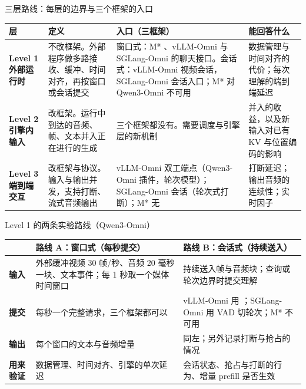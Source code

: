 
\begin{frame}[t]{三层路线：每层的边界与三个框架的入口}
\scriptsize
\renewcommand{\arraystretch}{1.1}
\setlength{\tabcolsep}{3pt}
\begin{tabularx}{\textwidth}{>{\bfseries}p{2.4cm} Y Y Y}
\toprule
{}
层 & 定义 & 入口（三框架） & 能回答什么 \\
\midrule
Level 1 外部运行时 & 不改框架。外部程序做多路接收、缓冲、时间对齐，再按窗口或会话提交 & 窗口式：M* 、vLLM-Omni 与 SGLang-Omni 的聊天接口。会话式：vLLM-Omni 视频会话，SGLang-Omni 会话入口；M* 对 Qwen3-Omni 不可用 & 数据管理与时间对齐的代价；每次理解的端到端延迟 \\
Level 2 引擎内输入 & 改框架。运行中到达的音频、帧、文本并入正在进行的生成 & 三个框架都没有。需要调度与引擎层的新机制 & 并入的收益，以及新输入对已有 KV 与位置编码的影响 \\
Level 3 端到端交互 & 改框架与协议。输入与输出并发，支持打断、流式音频输出 & vLLM-Omni 双工端点（Qwen3-Omni 插件，轮次模型）；SGLang-Omni 会话（轮次式打断）；M* 无 & 打断延迟；输出音频的连续性；实时因子 \\
\bottomrule
\end{tabularx}
\par{}
\par{}
\end{frame}

\begin{frame}[t]{Level 1 的两条实验路线（Qwen3-Omni）}
\scriptsize
\renewcommand{\arraystretch}{1.1}
\setlength{\tabcolsep}{3pt}
\begin{tabularx}{\textwidth}{>{\bfseries}p{2.3cm} Y Y}
\toprule
{}
 & 路线 A：窗口式（每秒提交） & 路线 B：会话式（持续送入） \\
\midrule
输入 & 外部缓冲视频 30 帧/秒、音频 20 毫秒一块、文本事件；每 1 秒取一个媒体时间窗口 & 持续送入帧与音频块；查询或轮次边界时提交理解 \\
提交 & 每秒一个完整请求，三个框架都可以 & vLLM-Omni 用 ；SGLang-Omni 用 VAD 切轮次；M* 不可用 \\
输出 & 每个窗口的文本与音频增量 & 同左；另外记录打断与抢占的情况 \\
用来验证 & 数据管理、时间对齐、引擎的单次延迟 & 会话状态、抢占与打断的行为、增量 prefill 是否生效 \\
\bottomrule
\end{tabularx}
\par{}
\par{}
\end{frame}

